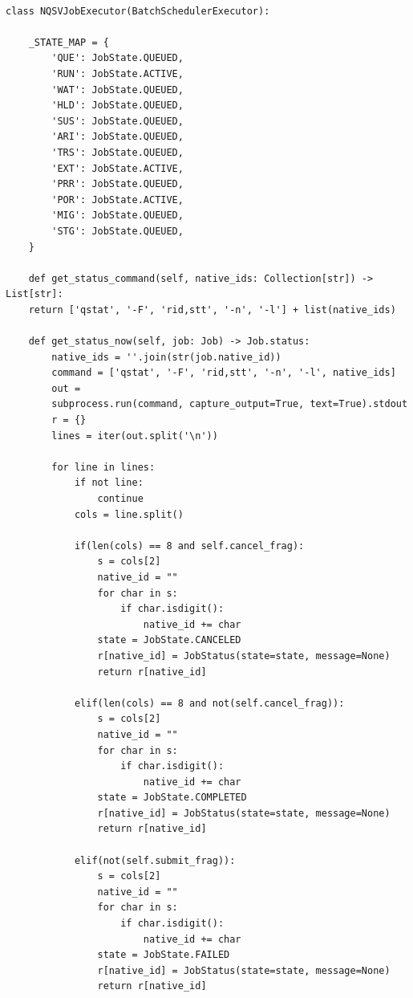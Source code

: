 \begin{lstlisting}[caption=ジョブの状態取得メソッド, label=get_status_now]

class NQSVJobExecutor(BatchSchedulerExecutor):

    _STATE_MAP = {
        'QUE': JobState.QUEUED,
        'RUN': JobState.ACTIVE,
        'WAT': JobState.QUEUED,
        'HLD': JobState.QUEUED,
        'SUS': JobState.QUEUED,
        'ARI': JobState.QUEUED,
        'TRS': JobState.QUEUED,
        'EXT': JobState.ACTIVE,
        'PRR': JobState.QUEUED,
        'POR': JobState.ACTIVE,
        'MIG': JobState.QUEUED,
        'STG': JobState.QUEUED, 
    }

    def get_status_command(self, native_ids: Collection[str]) -> List[str]:
    return ['qstat', '-F', 'rid,stt', '-n', '-l'] + list(native_ids) 

    def get_status_now(self, job: Job) -> Job.status:
        native_ids = ''.join(str(job.native_id))
        command = ['qstat', '-F', 'rid,stt', '-n', '-l', native_ids]
        out = 
        subprocess.run(command, capture_output=True, text=True).stdout
        r = {}
        lines = iter(out.split('\n'))

        for line in lines:
            if not line:
                continue
            cols = line.split()

            if(len(cols) == 8 and self.cancel_frag):
                s = cols[2]
                native_id = ""
                for char in s:
                    if char.isdigit():
                        native_id += char
                state = JobState.CANCELED
                r[native_id] = JobStatus(state=state, message=None)
                return r[native_id]
            
            elif(len(cols) == 8 and not(self.cancel_frag)):
                s = cols[2]
                native_id = ""
                for char in s:
                    if char.isdigit():
                        native_id += char
                state = JobState.COMPLETED
                r[native_id] = JobStatus(state=state, message=None)
                return r[native_id]

            elif(not(self.submit_frag)):
                s = cols[2]
                native_id = ""
                for char in s:
                    if char.isdigit():
                        native_id += char
                state = JobState.FAILED
                r[native_id] = JobStatus(state=state, message=None)
                return r[native_id]
            

\end{lstlisting}
